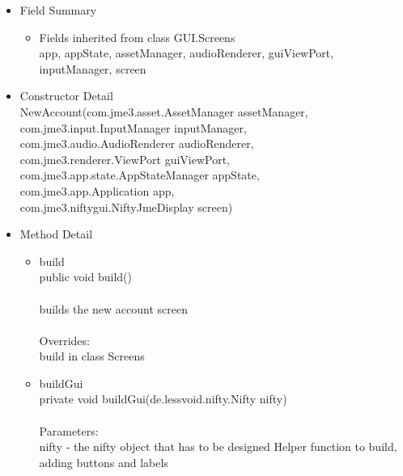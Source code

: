 \documentclass[letterpaper]{article}
\begin{document}
							\begin{itemize}
								\item	Field Summary
										\begin{itemize}
											\item	Fields inherited from class GUI.Screens \\
													app, appState, assetManager, audioRenderer, guiViewPort, inputManager, screen
										\end{itemize}
								\item	Constructor Detail \\
										NewAccount(com.jme3.asset.AssetManager assetManager, \\
		         com.jme3.input.InputManager inputManager, \\
		         com.jme3.audio.AudioRenderer audioRenderer, \\
		         com.jme3.renderer.ViewPort guiViewPort, \\
		         com.jme3.app.state.AppStateManager appState, \\
		         com.jme3.app.Application app, \\
		         com.jme3.niftygui.NiftyJmeDisplay screen)
								\item	Method Detail
										\begin{itemize}
											\item	build \\
													public void build() \\ \\
													builds the new account screen \\ \\
													Overrides: \\
													build in class Screens
											\item	buildGui \\
													private void buildGui(de.lessvoid.nifty.Nifty nifty) \\ \\
													Parameters: \\
													nifty - the nifty object that has to be designed Helper function to build, adding buttons and labels
										\end{itemize}
							\end{itemize}
						\newpage
\end{document}
